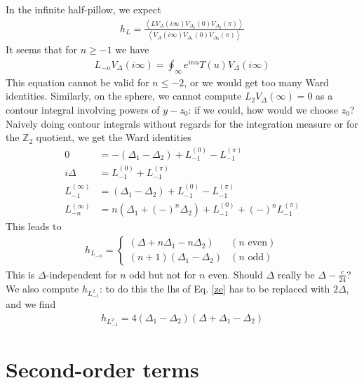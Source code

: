 \documentclass[12pt,a4paper]{article}
\begin{document}
In the infinite half-pillow, we expect
\begin{align}
 h_L = \frac{\left< LV_{\Delta}(i\infty)V_{\Delta_1}(0)V_{\Delta_2}(\pi)\right>}{\left< V_{\Delta}(i\infty)V_{\Delta_1}(0)V_{\Delta_2}(\pi)\right>}
\end{align}
It seems that for $n\geq -1$ we have 
\begin{align}
 L_{-n} V_\Delta(i\infty) = \oint_\infty e^{inu} T(u) V_\Delta(i\infty)
\end{align}
This equation cannot be valid for $n\leq -2$, or we would get too many Ward identities. Similarly, on the sphere, we cannot compute $L_2 V_\Delta(\infty) =0$ as a contour integral involving powers of $y-z_0$: if we could, how would we choose $z_0$? Naively doing contour integrals without regards for the integration measure or for the $\mathbb{Z}_2$ quotient, we get the Ward identities
\begin{align}
 0 &= -(\Delta_1-\Delta_2) + L_{-1}^{(0)} - L_{-1}^{(\pi)}
 \label{ze}
 \\
 i\Delta &= L_{-1}^{(0)} + L_{-1}^{(\pi)} 
 \\
 L_{-1}^{(\infty)} &= (\Delta_1-\Delta_2) + L_{-1}^{(0)} - L_{-1}^{(\pi)}
 \\
 L_{-n}^{(\infty)} &= n(\Delta_1+(-)^n\Delta_2) + L_{-1}^{(0)} +(-)^n L_{-1}^{(\pi)}
\end{align}
This leads to 
\begin{align}
 h_{L_{-n}} = \left\{\begin{array}{ll} (\Delta+n\Delta_1-n\Delta_2)  & (n \text{ even}) 
                      \\ (n+1)(\Delta_1-\Delta_2) & (n \text{ odd})
                     \end{array}\right.
\end{align}
This is $\Delta$-independent for $n$ odd but not for $n$ even. Should $\Delta$ really be $\Delta-\frac{c}{24}$? We also compute $h_{L_{-1}^2}$: to do this the lhs of Eq. \eqref{ze} has to be replaced with $2\Delta$, and we find 
\begin{align}
 h_{L_{-1}^2} = 4(\Delta_1-\Delta_2)(\Delta+\Delta_1-\Delta_2)
\end{align}


\section{Second-order terms}
\end{document}
